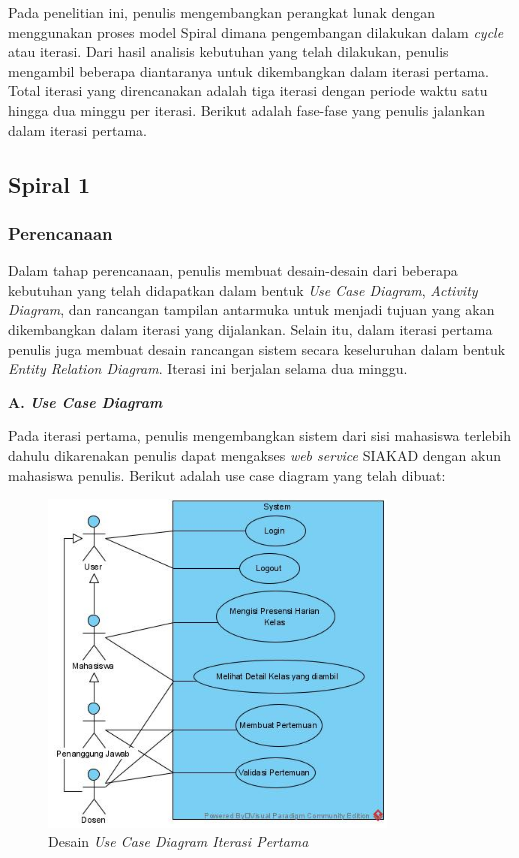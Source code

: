 Pada penelitian ini, penulis mengembangkan perangkat lunak dengan menggunakan proses model Spiral dimana pengembangan dilakukan dalam \emph{cycle} atau iterasi. Dari hasil analisis kebutuhan yang telah dilakukan, penulis mengambil beberapa diantaranya untuk dikembangkan dalam iterasi pertama. Total iterasi yang direncanakan adalah tiga iterasi dengan periode waktu satu hingga dua minggu per iterasi. Berikut adalah fase-fase yang penulis jalankan dalam iterasi pertama.

\subsection{Spiral 1}  %

\subsubsection{Perencanaan}

Dalam tahap perencanaan, penulis membuat desain-desain dari beberapa kebutuhan yang telah didapatkan dalam bentuk \textit{Use Case Diagram}, \textit{Activity Diagram}, dan rancangan tampilan antarmuka untuk menjadi tujuan yang akan dikembangkan dalam iterasi yang dijalankan. Selain itu, dalam iterasi pertama penulis juga membuat desain rancangan sistem secara keseluruhan dalam bentuk \textit{Entity Relation Diagram}. Iterasi ini berjalan selama dua minggu.

\textbf{A. \textit{Use Case Diagram}}

Pada iterasi pertama, penulis mengembangkan sistem dari sisi mahasiswa terlebih dahulu dikarenakan penulis dapat mengakses \textit{web service} SIAKAD dengan akun mahasiswa penulis. Berikut adalah use case diagram yang telah dibuat:

\begin{figure}[h!]
	\centering
	\includegraphics[width=0.8\textwidth]{gambar/diagram/Use Case Iteration 1}
	\caption{Desain \textit{Use Case Diagram Iterasi Pertama}}
	\label{fig:usecase1st}
\end{figure}

